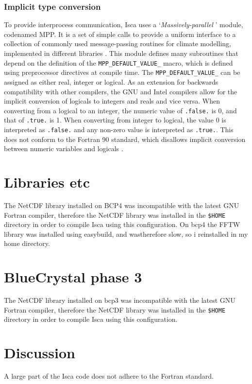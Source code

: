\documentclass[a4paper,11pt]{report}
\begin{document}
\subsubsection{Implicit type conversion}
To provide interprocess communication, Isca uses a `\textit{Massively-parallel} ' module, codenamed MPP. It is a set of simple calls to provide a uniform interface to a collection of commonly used message-passing routines for climate modelling, implemented in different libraries \cite{balaji2002fms}. This module defines many subroutines that depend on the definition of the \texttt{MPP\_DEFAULT\_VALUE\_} macro, which is defined using preprocessor directives at compile time. The \texttt{MPP\_DEFAULT\_VALUE\_} can be assigned as either real, integer or logical. As an extension for backwards compatibility with other compilers, the GNU and Intel compilers allow for the implicit conversion of logicals to integers and reals and vice versa. When converting from a logical to an integer, the numeric value of \texttt{.false.} is 0, and that of \texttt{.true.} is 1. When converting from integer to logical, the value 0 is interpreted as \texttt{.false.} and any non-zero value is interpreted as \texttt{.true.}. This does not conform to the Fortran 90 standard, which disallows implicit conversion between numeric variables and logicals \cite{fortran1991standard,gnu2019conversion}.




\section{Libraries etc}
The NetCDF library installed on BCP4 was incompatible with the latest GNU Fortran compiler, therefore the NetCDF library was installed in the \texttt{\$HOME} directory in order to compile Isca using this configuration. On bcp4 the FFTW library was installed using easybuild, and wastherefore slow, so i reinstalled in my home directory. 

\section{BlueCrystal phase 3}
The NetCDF library installed on \gls{bcp3} was incompatible with the latest GNU Fortran compiler, therefore the NetCDF library was installed in the \texttt{\$HOME} directory in order to compile Isca using this configuration. 

\section{Discussion}
A large part of the Isca code does not adhere to the Fortran standard. 
\end{document}
